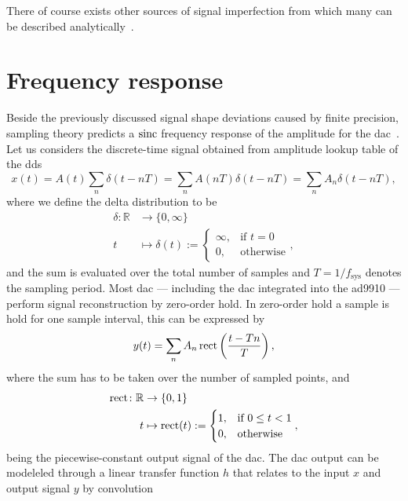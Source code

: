 There of course exists other sources of signal imperfection from which
many can be described analytically~\cite{Goldberg1994}. 

\section{Frequency response}

Beside the previously discussed signal shape deviations caused by finite
precision, sampling theory predicts a $\operatorname{sinc}$ frequency response of
the amplitude for the \gls{dac}~\cite{Oppenheim1997}. Let us considers the
discrete-time signal obtained from amplitude lookup table of the \gls{dds}
\begin{equation}
  x(t)
  =A(t)\sum_n \delta(t-nT)
  =\sum_n A(nT)\delta(t-nT)
  =\sum_n A_n\delta(t-nT)
  \label{eq:signal_sampled},
\end{equation}
where we define the delta distribution to be
\begin{align}
  \delta\colon\mathbb{R} &\to \{0,\infty\}\\
  t &\mapsto \delta(t):=
  \begin{cases}
    \infty, & \text{if }t=0\\
    0, & \text{otherwise}
  \end{cases}
  \label{eq:delta},
\end{align}
and the sum is evaluated over the total number of samples and
$T=1/f_\text{sys}$ denotes the sampling period. Most \gls{dac} --- including
the \gls{dac} integrated into the \gls{ad9910} --- perform signal
reconstruction by zero-order hold. In zero-order hold a sample is hold for
one sample interval, this can be expressed by
\begin{equation}
  y(t)
  =
  \sum_n A_n\operatorname{rect}\left(\frac{t-Tn}{T}\right)
  \label{eq:signal_reconstructed},
\end{equation}
where the sum has to be taken over the number of sampled points, and
\begin{align}
  \operatorname{rect}\colon\mathbb{R} &\to \{0,1\}\\
  t &\mapsto \operatorname{rect}(t):=
  \begin{cases}
    1, & \text{if }0\leq t<1\\
    0, & \text{otherwise}
  \end{cases}
  \label{eq:rect},
\end{align}
being the piecewise-constant output signal of the \gls{dac}. The \gls{dac}
output can be modeleled through a linear transfer function $h$ that relates
to the input $x$ and output signal $y$ by convolution
